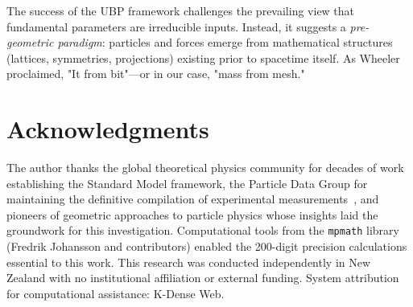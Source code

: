 \documentclass[11pt,a4paper]{article}
\begin{document}
The success of the UBP framework challenges the prevailing view that fundamental parameters are irreducible inputs. Instead, it suggests a \emph{pre-geometric paradigm}: particles and forces emerge from mathematical structures (lattices, symmetries, projections) existing prior to spacetime itself. As Wheeler proclaimed, "It from bit"—or in our case, "mass from mesh."

\section*{Acknowledgments}

The author thanks the global theoretical physics community for decades of work establishing the Standard Model framework, the Particle Data Group for maintaining the definitive compilation of experimental measurements~\cite{ref007}, and pioneers of geometric approaches to particle physics whose insights laid the groundwork for this investigation. Computational tools from the \texttt{mpmath} library (Fredrik Johansson and contributors) enabled the 200-digit precision calculations essential to this work. This research was conducted independently in New Zealand with no institutional affiliation or external funding. System attribution for computational assistance: K-Dense Web.



\end{document}
